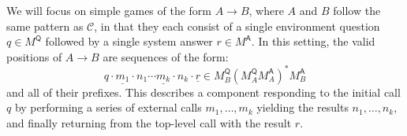 \documentclass[sigplan,10pt,review,anonymous]{acmart}
\newcommand{\kw}[1]{\ensuremath{ \mathsf{#1} }}
\begin{document}
We will focus on simple games of the form $A \rightarrow B$,
where $A$ and $B$ follow the same pattern as $\mathcal{C}$,
in that they each consist of a single environment question
$q \in M^\kw{Q}$
followed by a single system answer
$r \in M^\kw{A}$.
In this setting,
the valid positions of $A \rightarrow B$ are
sequences of the form:
\[
  q \cdot \underline{m_1} \cdot n_1 \cdots
          \underline{m_k} \cdot n_k \cdot \underline{r} \in
  M_B^\kw{Q} ( {M_A^\kw{Q}} M_A^\kw{A} )^* {M_B^\kw{A}}
\]
and all of their prefixes.
This describes a component responding to
the initial call $q$ by
performing a series of external calls $m_1, \ldots, m_k$
yielding the results $n_1, \ldots, n_k$,
and finally returning from the top-level call
with the result $r$.



%
%
%
%
%
\end{document}
